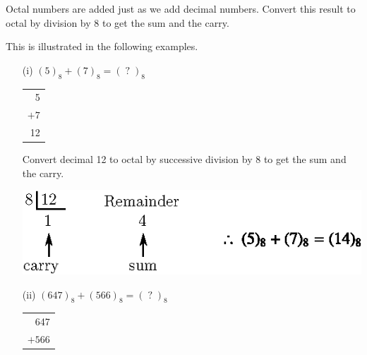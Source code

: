Octal numbers are added just as we add decimal numbers. Convert this result to octal by division by 8 to get the sum and the carry.

This is illustrated in the following examples.
\begin{itemize}
\item[(i)] $(5)_{8}+(7)_{8}=(\;?\;)_{8}$

\medskip

\begin{tabular}{r}
5\\
$+7$\\
\hline
12
\end{tabular}

Convert decimal 12 to octal by successive division by 8 to get the sum and the carry.
\centerline{\includegraphics[scale=1.1]{chap6/fig24.eps}}

\item[(ii)] $(647)_{8}+(566)_{8}=(\;?\;)_{8}$

\medskip
\begin{tabular}{r}
647\\
$+566$\\
\hline
\end{tabular}
\end{itemize}

